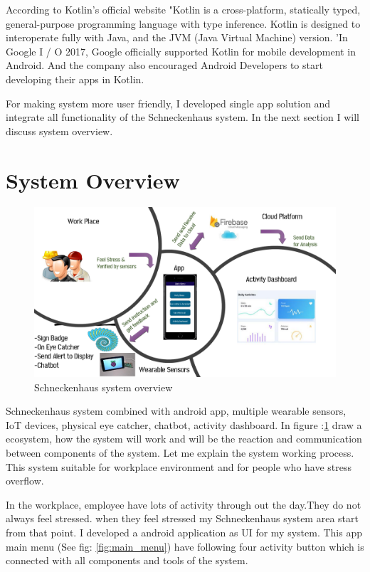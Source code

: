 According to Kotlin's official website "Kotlin is a cross-platform, statically typed, general-purpose programming language with type inference. Kotlin is designed to interoperate fully with Java, and the JVM (Java Virtual  Machine) version. 'In Google I / O 2017, Google officially supported Kotlin for mobile development in Android. And the company also encouraged Android Developers to start developing their apps in Kotlin. 

For making system more user friendly, I developed single app solution and integrate all functionality of the Schneckenhaus  system. In the next section I will discuss system overview.

\section{System Overview}

\begin{figure}[hbt!] 
  \centering
  \includegraphics[width=1.0\linewidth]{chap4/image4/Overview.pdf}
  \caption[Schneckenhaus system overview ]{Schneckenhaus system overview}
  \label{fig:overview_Stress}
\end{figure}
Schneckenhaus system combined with android app, multiple wearable sensors, IoT devices, physical eye catcher, chatbot, activity dashboard. In figure :\ref{fig:overview_Stress} draw a ecosystem, how the system will work and will be the reaction and communication between components of the system. Let me explain the system working process. This system suitable for workplace environment and for people who have stress overflow.

In the workplace, employee have lots of activity through out the day.They do not always feel stressed. when they feel stressed my Schneckenhaus system area start from that point. I developed a android application as \acf{UI} for my system. This app main menu (See fig: \ref{fig:main_menu}) have following four activity button which is connected with all components and tools of the system. 

